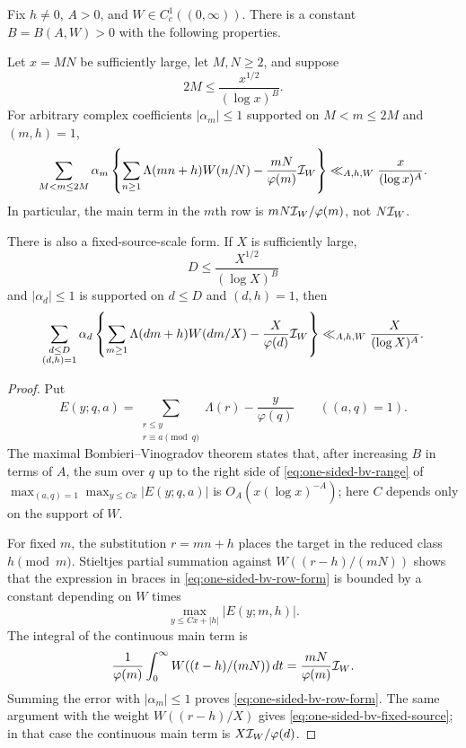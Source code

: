 \begin{theorem}
\label{thm:one-sided-bv-type-I}
Fix $h\ne0$, $A>0$, and $W\in C_c^1((0,\infty))$.  There is a constant
$B=B(A,W)>0$ with the following properties.

Let $x=MN$ be sufficiently large, let $M,N\geq2$, and suppose
\begin{equation}\label{eq:one-sided-bv-range}
 2M\leq \frac{x^{1/2}}{(\log x)^B}.
\end{equation}
For arbitrary complex coefficients $|\alpha_m|\leq1$ supported on
$M<m\leq2M$ and $(m,h)=1$,
\begin{equation}\label{eq:one-sided-bv-row-form}
 \sum_{M<m\leq2M}\alpha_m
 \left\{
   \sum_{n\geq1}\Lambda(mn+h)W(n/N)
   -\frac{mN}{\varphi(m)}\mathcal I_W
 \right\}
 \ll_{A,h,W}\frac{x}{(\log x)^A}.
\end{equation}
In particular, the main term in the $m$th row is
$mN\mathcal I_W/\varphi(m)$, not $N\mathcal I_W$.

There is also a fixed-source-scale form.  If $X$ is sufficiently large,
\begin{equation}\label{eq:fixed-source-bv-range}
 D\leq\frac{X^{1/2}}{(\log X)^B}
\end{equation}
and $|\alpha_d|\leq1$ is supported on $d\leq D$ and $(d,h)=1$, then
\begin{equation}\label{eq:one-sided-bv-fixed-source}
 \sum_{\substack{d\leq D\\(d,h)=1}}\alpha_d
 \left\{
   \sum_{m\geq1}\Lambda(dm+h)W(dm/X)
   -\frac{X}{\varphi(d)}\mathcal I_W
 \right\}
 \ll_{A,h,W}\frac{X}{(\log X)^A}.
\end{equation}
\end{theorem}

\begin{proof}
Put
\[
 E(y;q,a)=
 \sum_{\substack{r\leq y\\r\equiv a\pmod q}}\Lambda(r)
 -\frac{y}{\varphi(q)}
 \qquad ((a,q)=1).
\]
The maximal Bombieri--Vinogradov theorem states that, after increasing
$B$ in terms of $A$, the sum over $q$ up to the right side of
\eqref{eq:one-sided-bv-range} of
$\max_{(a,q)=1}\max_{y\leq Cx}|E(y;q,a)|$ is
$O_A(x(\log x)^{-A})$; here $C$ depends only on the support of $W$.

For fixed $m$, the substitution $r=mn+h$ places the target in the reduced
class $h\pmod m$.  Stieltjes partial summation against
$W((r-h)/(mN))$ shows that the expression in braces in
\eqref{eq:one-sided-bv-row-form} is bounded by a constant depending on
$W$ times
\[
 \max_{y\leq Cx+|h|}|E(y;m,h)|.
\]
The integral of the continuous main term is
\[
 \frac1{\varphi(m)}
 \int_0^\infty W((t-h)/(mN))\,dt
 =\frac{mN}{\varphi(m)}\mathcal I_W.
\]
Summing the error with $|\alpha_m|\leq1$ proves
\eqref{eq:one-sided-bv-row-form}.  The same argument with the weight
$W((r-h)/X)$ gives \eqref{eq:one-sided-bv-fixed-source}; in that case the
continuous main term is $X\mathcal I_W/\varphi(d)$.
\end{proof}

